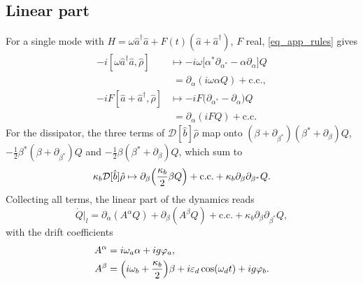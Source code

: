 \documentclass[aps,prx,reprint,floatfix,amsmath,amssymb,longbibliography]{revtex4-2}
\newcommand{\eps}{\varepsilon}
\newcommand{\da}{^\dagger}
\newcommand{\ha}{\hat{a}}
\newcommand{\hb}{\hat{b}}
\begin{document}
\subsection{Linear part}
For a single mode with $H=\omega\ha\da\ha+F(t)(\ha+\ha\da)$, $F$ real, \cref{eq_app_rules} gives
\begin{align}
    -i[\omega\ha\da\ha,\hat\rho] &\mapsto -i\omega\bigl[\alpha^*\partial_{\alpha^*}-\alpha\partial_\alpha\bigr]Q \nonumber\\
    &\;= \partial_\alpha(i\omega\alpha Q)+\text{c.c.},\\
    -iF[\ha+\ha\da,\hat\rho] &\mapsto -iF\bigl(\partial_{\alpha^*}-\partial_\alpha\bigr)Q \nonumber\\
    &\;= \partial_\alpha(iFQ)+\text{c.c.}
\end{align}
For the dissipator, the three terms of $\mathcal{D}[\hb]\hat\rho$ map onto $(\beta+\partial_{\beta^*})(\beta^*+\partial_\beta)Q$, $-\tfrac12\beta^*(\beta+\partial_{\beta^*})Q$ and $-\tfrac12\beta(\beta^*+\partial_\beta)Q$, which sum to
\begin{equation}
    \kappa_b\mathcal{D}[\hb]\hat\rho \mapsto \partial_\beta\Bigl(\frac{\kappa_b}{2}\beta Q\Bigr)+\text{c.c.}+\kappa_b\partial_\beta\partial_{\beta^*}Q .
\end{equation}
Collecting all terms, the linear part of the dynamics reads
\begin{equation}
    \dot Q\big|_l=\partial_\alpha(A^\alpha Q)+\partial_\beta(A^\beta Q)+\text{c.c.}+\kappa_b\partial_\beta\partial_{\beta^*}Q,
    \label{eq_app_Q_linear}
\end{equation}
with the drift coefficients
\begin{align}
    A^\alpha &= i\omega_a\alpha+ig\varphi_a,\\
    A^\beta &= \Bigl(i\omega_b+\frac{\kappa_b}{2}\Bigr)\beta+i\eps_d\cos(\omega_d t)+ig\varphi_b .
\end{align}
\end{document}
